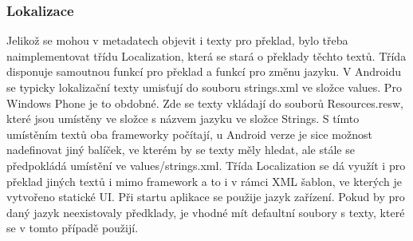 \subsubsection{Lokalizace}
Jelikož se mohou v metadatech objevit i texty pro překlad, bylo třeba naimplementovat třídu Localization, která se stará o překlady těchto textů. Třída disponuje samoutnou funkcí pro překlad a funkcí pro změnu jazyku. V Androidu se typicky lokalizační texty umisťují do souboru strings.xml ve složce values. Pro Windows Phone je to obdobné. Zde se texty vkládají do souborů Resources.resw, které jsou umístěny ve složce s názvem jazyku ve složce Strings. S tímto umístěním textů oba frameworky počítají, u Android verze je sice možnost nadefinovat jiný balíček, ve kterém by se texty měly hledat, ale stále se předpokládá umístění ve values/strings.xml. Třída Localization se dá využít i pro překlad jiných textů i mimo framework a to i v rámci XML šablon, ve kterých je vytvořeno statické UI. Při startu aplikace se použije jazyk zařízení. Pokud by pro daný jazyk neexistovaly předklady, je vhodné mít defaultní soubory s texty, které se v tomto případě použijí.